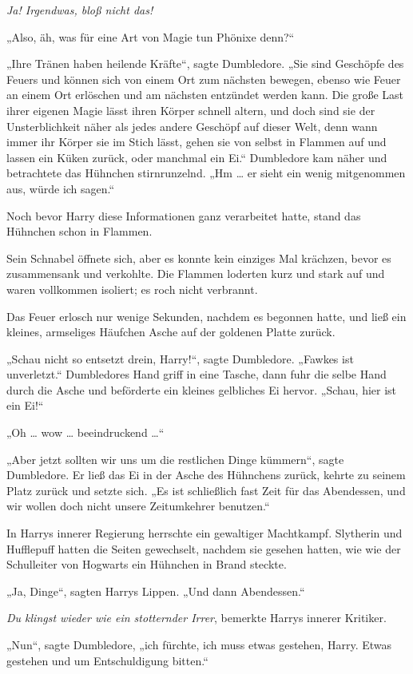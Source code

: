{\emph{Ja! Irgendwas, bloß nicht das!}

„Also, äh, was für eine Art von Magie tun Phönixe denn?“

„Ihre Tränen haben heilende Kräfte“, sagte Dumbledore. „Sie sind Geschöpfe des Feuers und können sich von einem Ort zum nächsten bewegen, ebenso wie Feuer an einem Ort erlöschen und am nächsten entzündet werden kann. Die große Last ihrer eigenen Magie lässt ihren Körper schnell altern, und doch sind sie der Unsterblichkeit näher als jedes andere Geschöpf auf dieser Welt, denn wann immer ihr Körper sie im Stich lässt, gehen sie von selbst in Flammen auf und lassen ein Küken zurück, oder manchmal ein Ei.“ Dumbledore kam näher und betrachtete das Hühnchen stirnrunzelnd. „Hm … er sieht ein wenig mitgenommen aus, würde ich sagen.“

Noch bevor Harry diese Informationen ganz verarbeitet hatte, stand das Hühnchen schon in Flammen.

Sein Schnabel öffnete sich, aber es konnte kein einziges Mal krächzen, bevor es zusammensank und verkohlte. Die Flammen loderten kurz und stark auf und waren vollkommen isoliert; es roch nicht verbrannt.

Das Feuer erlosch nur wenige Sekunden, nachdem es begonnen hatte, und ließ ein kleines, armseliges Häufchen Asche auf der goldenen Platte zurück.

„Schau nicht so entsetzt drein, Harry!“, sagte Dumbledore. „Fawkes ist unverletzt.“ Dumbledores Hand griff in eine Tasche, dann fuhr die selbe Hand durch die Asche und beförderte ein kleines gelbliches Ei hervor. „Schau, hier ist ein Ei!“

„Oh … wow … beeindruckend …“

„Aber jetzt sollten wir uns um die restlichen Dinge kümmern“, sagte Dumbledore. Er ließ das Ei in der Asche des Hühnchens zurück, kehrte zu seinem Platz zurück und setzte sich. „Es ist schließlich fast Zeit für das Abendessen, und wir wollen doch nicht unsere Zeitumkehrer benutzen.“

In Harrys innerer Regierung herrschte ein gewaltiger Machtkampf. Slytherin und Hufflepuff hatten die Seiten gewechselt, nachdem sie gesehen hatten, wie wie der Schulleiter von Hogwarts ein Hühnchen in Brand steckte.

„Ja, Dinge“, sagten Harrys Lippen. „Und dann Abendessen.“

\emph{Du klingst wieder wie ein stotternder Irrer}, bemerkte Harrys innerer Kritiker.

„Nun“, sagte Dumbledore, „ich fürchte, ich muss etwas gestehen, Harry. Etwas gestehen und um Entschuldigung bitten.“

}
